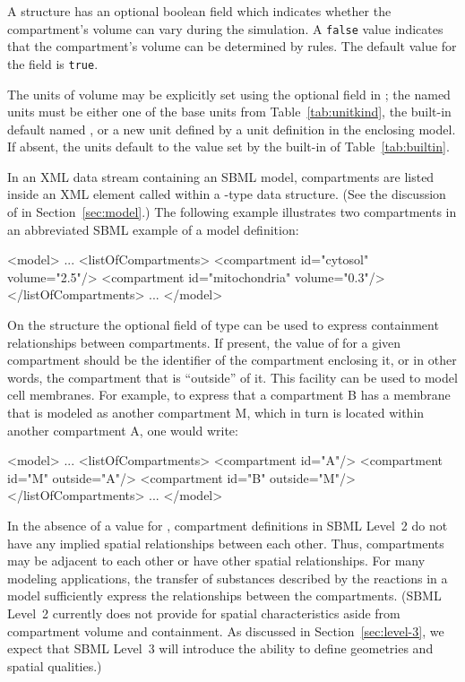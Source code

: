 \documentclass[10pt,twocolumntoc]{cekarticle}
\newcommand{\vref}[1]{\ref{#1}}
\begin{document}
A  structure has an optional 
boolean field which indicates whether the compartment's volume can
vary during the simulation.  A \texttt{false} value indicates that
the compartment's volume can be determined by rules.
The default value for the  field is
\texttt{true}.

The units of volume may be explicitly set using the optional field
 in ; the named units must be either one
of the base units from Table~\vref{tab:unitkind}, the built-in default
named , or a new unit defined by a unit definition in the
enclosing model.  If absent, the units default to the value set by the
built-in  of Table~\ref{tab:builtin}.

In an XML data stream containing an SBML model, compartments are listed
inside an XML element called  within a
-type data structure.  (See the discussion of  in
Section~\ref{sec:model}.)  The following example illustrates two
compartments in an abbreviated SBML example of a model definition:

\begin{example}
<model>
    ...
    <listOfCompartments>
        <compartment id="cytosol" volume="2.5"/>
        <compartment id="mitochondria" volume="0.3"/>
    </listOfCompartments>
    ...
</model>
\end{example}

On the  structure the optional field  of type  can be used to express containment relationships between compartments. If present, the value of  for a given compartment should be the identifier of the compartment enclosing it, or in other words, the compartment that is ``outside'' of it.  This facility can be used to model cell membranes.  For example, to express that a compartment B has a membrane that is modeled as another compartment M, which in turn is located within another compartment A, one would write:
\begin{example}
<model>
    ...
    <listOfCompartments>
        <compartment id="A"/>
        <compartment id="M" outside="A"/>
        <compartment id="B" outside="M"/>
    </listOfCompartments>
    ...
</model>
\end{example}

In the absence of a value for , compartment
definitions in SBML Level~2 do not have any implied spatial
relationships between each other.  Thus, compartments may be
adjacent to each other or have other spatial relationships.  For
many modeling applications, the transfer of substances described
by the reactions in a model sufficiently express the relationships
between the compartments.  (SBML Level~2 currently does not
provide for spatial characteristics aside from compartment volume
and containment.  As discussed in Section~\ref{sec:level-3}, we
expect that SBML Level~3 will introduce the ability to define
geometries and spatial qualities.)
\end{document}
